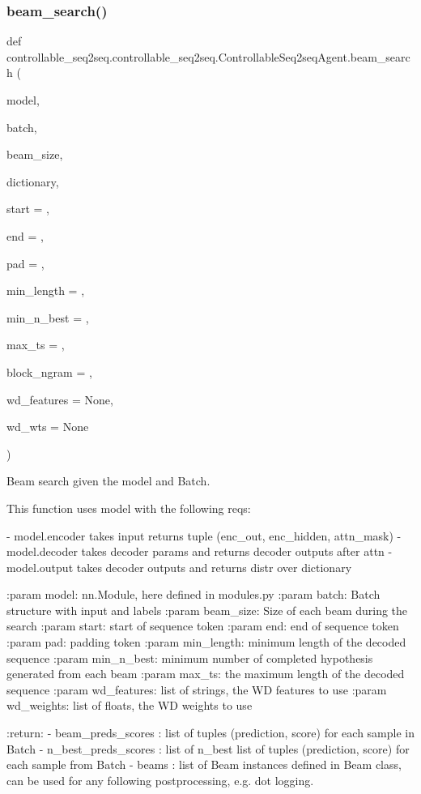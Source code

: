\subsubsection{\texorpdfstring{beam\+\_\+search()}{beam\_search()}}
{\footnotesize\ttfamily def controllable\+\_\+seq2seq.\+controllable\+\_\+seq2seq.\+Controllable\+Seq2seq\+Agent.\+beam\+\_\+search (\begin{DoxyParamCaption}\item[{}]{model,  }\item[{}]{batch,  }\item[{}]{beam\+\_\+size,  }\item[{}]{dictionary,  }\item[{}]{start = {},  }\item[{}]{end = {},  }\item[{}]{pad = {},  }\item[{}]{min\+\_\+length = {},  }\item[{}]{min\+\_\+n\+\_\+best = {},  }\item[{}]{max\+\_\+ts = {},  }\item[{}]{block\+\_\+ngram = {},  }\item[{}]{wd\+\_\+features = {\ttfamily None},  }\item[{}]{wd\+\_\+wts = {\ttfamily None} }\end{DoxyParamCaption})\hspace{0.3cm}{\ttfamily [static]}}

\begin{DoxyVerb}Beam search given the model and Batch.

This function uses model with the following reqs:

- model.encoder takes input returns tuple (enc_out, enc_hidden, attn_mask)
- model.decoder takes decoder params and returns decoder outputs after attn
- model.output takes decoder outputs and returns distr over dictionary

:param model: nn.Module, here defined in modules.py
:param batch: Batch structure with input and labels
:param beam_size: Size of each beam during the search
:param start: start of sequence token
:param end: end of sequence token
:param pad: padding token
:param min_length: minimum length of the decoded sequence
:param min_n_best: minimum number of completed hypothesis generated
    from each beam
:param max_ts: the maximum length of the decoded sequence
:param wd_features: list of strings, the WD features to use
:param wd_weights: list of floats, the WD weights to use

:return:
    - beam_preds_scores : list of tuples (prediction, score) for each
      sample in Batch
    - n_best_preds_scores : list of n_best list of tuples (prediction,
      score) for each sample from Batch
    - beams : list of Beam instances defined in Beam class, can be used
      for any following postprocessing, e.g. dot logging.
\end{DoxyVerb}
 


